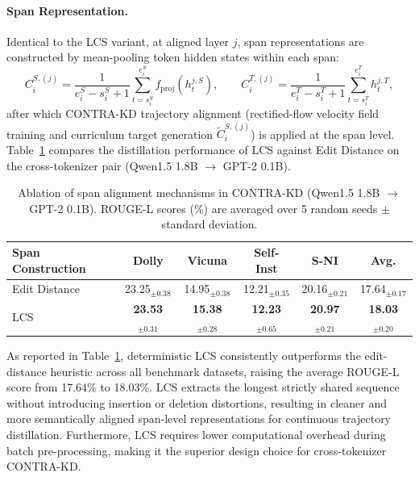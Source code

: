 \documentclass{article} %
\theoremstyle{definition}
\theoremstyle{remark}
\begin{document}
\paragraph{Span Representation.}
Identical to the LCS variant, at aligned layer $j$, span representations are constructed by mean-pooling token hidden states within each span:
\begin{equation}
    C^{S,(j)}_i = \frac{1}{e^S_i - s^S_i + 1} \sum_{t=s^S_i}^{e^S_i} f_\mathrm{proj}(h^{j,S}_t), \qquad C^{T,(j)}_i = \frac{1}{e^T_i - s^T_i + 1} \sum_{t=s^T_i}^{e^T_i} h^{j,T}_t,
\end{equation}
after which CONTRA-KD trajectory alignment (rectified-flow velocity field training and curriculum target generation $\tilde{C}^{S,(j)}_i$) is applied at the span level. Table~\ref{tab:span_alignment_ablation} compares the distillation performance of LCS against Edit Distance on the cross-tokenizer pair (Qwen1.5 1.8B $\rightarrow$ GPT-2 0.1B).

\begin{table}[htbp]
\centering
\small
\setlength{\tabcolsep}{5pt}
\caption{Ablation of span alignment mechanisms in CONTRA-KD (Qwen1.5 1.8B $\rightarrow$ GPT-2 0.1B). ROUGE-L scores (\%) are averaged over 5 random seeds $\pm$ standard deviation.}
\label{tab:span_alignment_ablation}
\begin{tabular}{lccccc}
\toprule
\textbf{Span Construction} & \textbf{Dolly} & \textbf{Vicuna} & \textbf{Self-Inst} & \textbf{S-NI} & \textbf{Avg.} \\
\midrule
Edit Distance & 23.25$_{\pm 0.38}$ & 14.95$_{\pm 0.38}$ & 12.21$_{\pm 0.35}$ & 20.16$_{\pm 0.21}$ & 17.64$_{\pm 0.17}$ \\
LCS     & \textbf{23.53}$_{\pm 0.31}$ & \textbf{15.38}$_{\pm 0.28}$ & \textbf{12.23}$_{\pm 0.65}$ & \textbf{20.97}$_{\pm 0.21}$ & \textbf{18.03}$_{\pm 0.20}$ \\
\bottomrule
\end{tabular}
\end{table}

As reported in Table~\ref{tab:span_alignment_ablation}, deterministic LCS consistently outperforms the edit-distance heuristic across all benchmark datasets, raising the average ROUGE-L score from 17.64\% to 18.03\%. LCS extracts the longest strictly shared sequence without introducing insertion or deletion distortions, resulting in cleaner and more semantically aligned span-level representations for continuous trajectory distillation. Furthermore, LCS requires lower computational overhead during batch pre-processing, making it the superior design choice for cross-tokenizer CONTRA-KD.
\end{document}
